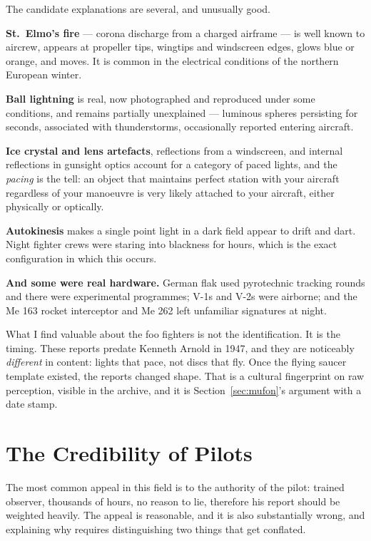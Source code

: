 The candidate explanations are several, and unusually good.

\textbf{St.~Elmo's fire} --- corona discharge from a charged airframe --- is well known to
aircrew, appears at propeller tips, wingtips and windscreen edges, glows blue or orange, and
moves. It is common in the electrical conditions of the northern European winter.

\textbf{Ball lightning} is real, now photographed and reproduced under some conditions, and
remains partially unexplained --- luminous spheres persisting for seconds, associated with
thunderstorms, occasionally reported entering aircraft.

\textbf{Ice crystal and lens artefacts}, reflections from a windscreen, and internal reflections
in gunsight optics account for a category of paced lights, and the \emph{pacing} is the tell: an
object that maintains perfect station with your aircraft regardless of your manoeuvre is very
likely attached to your aircraft, either physically or optically.

\textbf{Autokinesis} makes a single point light in a dark field appear
to drift and dart. Night fighter crews were staring into blackness for hours, which is the exact
configuration in which this occurs.

\textbf{And some were real hardware.} German flak used pyrotechnic tracking rounds and there were
experimental programmes; V-1s and V-2s were airborne; and the Me 163 rocket interceptor and Me 262
left unfamiliar signatures at night.

What I find valuable about the foo fighters is not the identification. It is the timing. These
reports predate Kenneth Arnold in 1947, and they are noticeably \emph{different} in content:
lights that pace, not discs that fly. Once the flying saucer template existed, the reports
changed shape. That is a cultural fingerprint on raw perception, visible in the archive, and it is
Section~\ref{sec:mufon}'s argument with a date stamp.

\section{The Credibility of Pilots}\label{sec:pilots}

The most common appeal in this field is to the authority of the pilot: trained observer,
thousands of hours, no reason to lie, therefore his report should be weighted heavily. The appeal
is reasonable, and it is also substantially wrong, and explaining why requires distinguishing two
things that get conflated.

